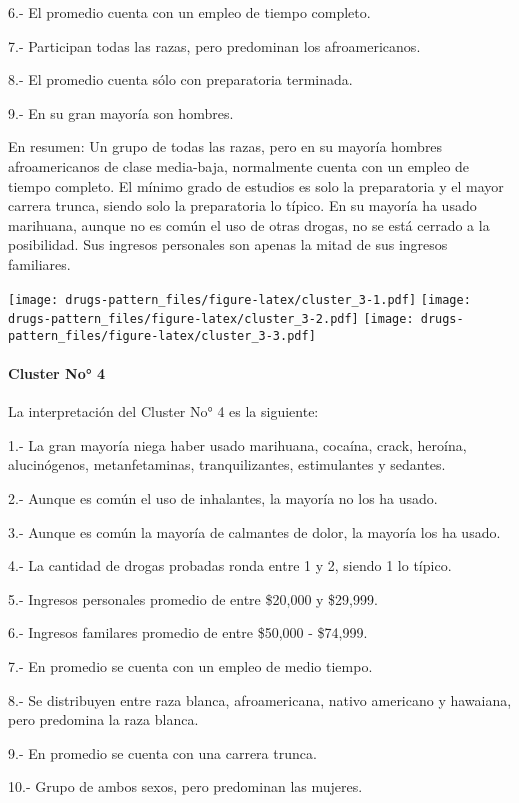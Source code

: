 \documentclass[]{article}
\let\oldparagraph\paragraph
\renewcommand{\paragraph}[1]{\oldparagraph{#1}\mbox{}}
\begin{document}
6.- El promedio cuenta con un empleo de tiempo completo.

7.- Participan todas las razas, pero predominan los afroamericanos.

8.- El promedio cuenta sólo con preparatoria terminada.

9.- En su gran mayoría son hombres.

En resumen: Un grupo de todas las razas, pero en su mayoría hombres
afroamericanos de clase media-baja, normalmente cuenta con un empleo de
tiempo completo. El mínimo grado de estudios es solo la preparatoria y
el mayor carrera trunca, siendo solo la preparatoria lo típico. En su
mayoría ha usado marihuana, aunque no es común el uso de otras drogas,
no se está cerrado a la posibilidad. Sus ingresos personales son apenas
la mitad de sus ingresos familiares.

\texttt{[image: drugs-pattern\_files/figure-latex/cluster\_3-1.pdf]}
\texttt{[image: drugs-pattern\_files/figure-latex/cluster\_3-2.pdf]}
\texttt{[image: drugs-pattern\_files/figure-latex/cluster\_3-3.pdf]}

\paragraph{Cluster No° 4}\label{cluster-no-4}

La interpretación del Cluster No° 4 es la siguiente:

1.- La gran mayoría niega haber usado marihuana, cocaína, crack,
heroína, alucinógenos, metanfetaminas, tranquilizantes, estimulantes y
sedantes.

2.- Aunque es común el uso de inhalantes, la mayoría no los ha usado.

3.- Aunque es común la mayoría de calmantes de dolor, la mayoría los ha
usado.

4.- La cantidad de drogas probadas ronda entre 1 y 2, siendo 1 lo
típico.

5.- Ingresos personales promedio de entre \$20,000 y \$29,999.

6.- Ingresos familares promedio de entre \$50,000 - \$74,999.

7.- En promedio se cuenta con un empleo de medio tiempo.

8.- Se distribuyen entre raza blanca, afroamericana, nativo americano y
hawaiana, pero predomina la raza blanca.

9.- En promedio se cuenta con una carrera trunca.

10.- Grupo de ambos sexos, pero predominan las mujeres.
\end{document}
